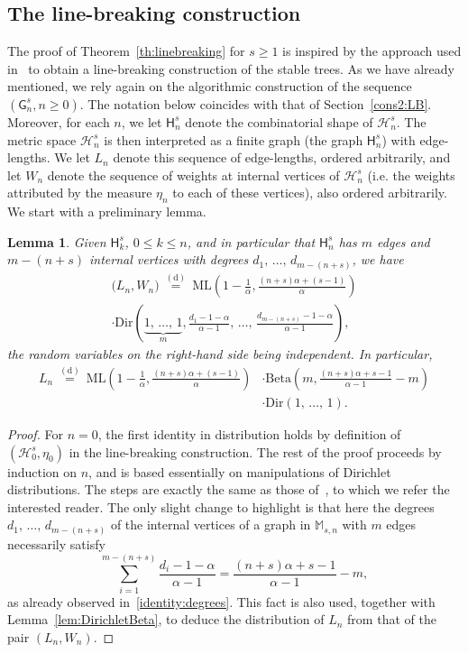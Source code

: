 \documentclass[10pt]{amsart}
\newtheorem{lemm}[theo]{Lemma}\newtheorem{prop}[theo]{Proposition}\newtheorem{coro}[theo]{Corollary}\newtheorem{conj}[theo]{Conjecture}
\theoremstyle{definition}\newtheorem{defi}[theo]{Definition}\newtheorem{rema}[theo]{Remark}\newtheorem{exam}[theo]{Example}\newtheorem{exem}[theo]{Example}\newtheorem{nota}[theo]{Notation}
\newcommand{\Betal}{\mathrm{Beta}}
\newcommand{\ML}{\mathrm{ML}}
\newcommand{\Dir}{\mathrm{Dir}}
\newcommand{\cH}{\mathcal{H}}
\newcommand{\sG}{\mathsf{G}}
\newcommand{\sH}{\mathsf{H}}
\newcommand{\M}{\mathbb{M}}
\begin{document}
\subsection{The line-breaking construction}\label{sec:LB}

The proof of Theorem~\ref{th:linebreaking} for $s \geq 1$ is inspired by the approach used in~\cite{GHlinebreaking} to obtain a line-breaking construction of the stable trees. As we have already mentioned, we rely again on the algorithmic construction of the sequence $(\sG_n^s,n\geq 0)$. The notation below coincides with that of Section~\ref{cons2:LB}. Moreover, for each $n$, we let $\sH^s_{n}$ denote the combinatorial shape of $\cH^s_n$. The metric space $\cH^s_{n}$ is then interpreted as a finite graph (the graph $\sH^s_{n}$) with edge-lengths. We let $L_{n}$ denote this sequence of edge-lengths, ordered arbitrarily, and let $W_{n}$ denote the sequence of weights at internal vertices of $\cH^s_{n}$ (i.e. the weights attributed by the measure $\eta_n$ to each of these vertices), also ordered arbitrarily. We start with a preliminary lemma.

\begin{lemm}\label{lem:lengthslinebreaking}
Given $\sH^s_{k}$, $0 \leq k \leq n$, and in particular that $\sH^{s}_n$ has $m$ edges and $m-(n+s)$ internal vertices with degrees $d_1,\,\ldots,\,d_{m-(n+s)}$, we have
\begin{multline*}
\big(L_{n}, W_{n}\big) \ \overset{\mathrm{(d)}}= \ \ML\left(1-\frac{1}{\alpha},\frac{(n+s) \alpha +(s-1)}{\alpha} \right) \\
\cdot \Dir\left(\underbrace{1,\,\ldots,\,1}_m,\frac{d_1-1-\alpha}{\alpha-1},\,\ldots,\,\frac{d_{m-(n+s)}-1-\alpha}{\alpha-1}\right),
\end{multline*}
the random variables on the right-hand side being independent. In particular,
\begin{align*}
L_{n} \ \overset{\mathrm{(d)}}= \ \ML\left(1-\frac{1}{\alpha},\frac{(n+s) \alpha +(s-1)}{\alpha} \right) &\cdot \Betal\left(m, \frac{(n+s)\alpha+s-1}{\alpha-1}-m \right)\\
&\cdot \Dir\left(1,\,\ldots,\,1\right).
\end{align*}
\end{lemm}

\begin{proof}
For $n=0$, the first identity in distribution holds by definition of $(\cH^s_{0},\eta_0)$ in the line-breaking construction. The rest of the proof proceeds by induction on $n$, and is based essentially on manipulations of Dirichlet distributions. The steps are exactly the same as those of~\cite[Proposition~3.2]{GHlinebreaking}, to which we refer the interested reader. The only slight change to highlight is that here the degrees $d_1,\,\ldots,\,d_{m-{(n+s)}}$ of the internal vertices of a graph in $\M_{s,n}$ with $m$ edges necessarily satisfy
\[
\sum_{i=1}^{m-(n+s)}\frac{d_i-1-\alpha}{\alpha-1}=\frac{(n+s)\alpha+s-1}{\alpha-1}-m,
\]
as already observed in~\eqref{identity:degrees}. This fact is also used, together with Lemma~\ref{lem:DirichletBeta}, to deduce the distribution of $L_{n}$ from that of the pair $(L_{n},W_{n})$.
\end{proof}
\end{document}

